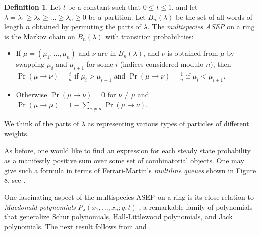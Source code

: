\documentclass[11pt]{amsart}
\theoremstyle{definition}
\newtheorem{definition}[theorem]{Definition}
\theoremstyle{remark}
\begin{document}
	\begin{definition}
 Let $t$ be a constant such that $0 \leq t \leq 1$, and 
let $\lambda = \lambda_1 \geq \lambda_2 \geq \dots 
\geq \lambda_n \geq 0$
be a partition. %
Let $B_n(\lambda)$
 be the set of all words of length $n$
obtained by permuting the parts of $\lambda$.
The \emph{multispecies ASEP}
	on a ring
        is the Markov chain on $B_n(\lambda)$
        with transition probabilities:
\begin{itemize}
	\item If $\mu = (\mu_1,\dots,\mu_n)$ and $\nu$ are in $B_n(\lambda)$,
		and $\nu$ is obtained from $\mu$ by swapping %
		$\mu_i$ and $\mu_{i+1}$ for some $i$ (indices considered modulo $n$),
then
		$\Pr(\mu \to \nu) = \frac{t}{n}$ if $\mu_i>\mu_{i+1}$ and 
		$\Pr(\mu \to \nu) = \frac{1}{n}$ if $\mu_i<\mu_{i+1}$.
\item Otherwise $\Pr(\mu \to \nu) = 0$ for $\nu \neq \mu$ and
	$\Pr(\mu \to \mu) = 1-\sum_{\nu \neq \mu} \Pr(\mu \to \nu)$.
\end{itemize}
We think of the parts of $\lambda$ 
as representing various types of
particles of different weights.
	\end{definition}
	
As before, one would like to find an expression for each steady
state probability  as a manifestly positive
sum over some set of combinatorial objects.  
One may give such a
formula in terms of Ferrari-Martin's
\emph{multiline queues} shown in Figure 8,
see \cite{Martin, CMW2}.  


One fascinating aspect %
of the multispecies
ASEP on a ring is its close relation \cite{CGW} 
to \emph{Macdonald polynomials} $P_{\lambda}(x_1,\dots,x_n; q,t)$ \cite{Macdonald},
a remarkable family of polynomials that generalize 
Schur polynomials, Hall-Littlewood polynomials, and Jack 
polynomials.   The next result 
follows  from \cite{CGW} and \cite{CMW2}.
\end{document}
